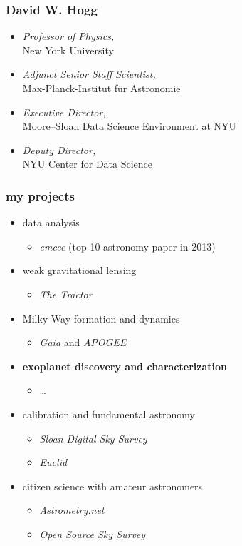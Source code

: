 \documentclass{beamer}
\renewcommand{\emph}[1]{\textbf{#1}}
\newcommand{\project}[1]{\textsl{#1}}
\begin{document}
\begin{frame}
  \frametitle{David W. Hogg}
  \begin{itemize}
  \item \textsl{Professor of Physics,}\\ New York University
  \item \textsl{Adjunct Senior Staff Scientist,}\\ Max-Planck-Institut f\"ur Astronomie
  \item \textsl{Executive Director,}\\ Moore--Sloan Data Science Environment at NYU
  \item \textsl{Deputy Director,}\\ NYU Center for Data Science
  \end{itemize}
\end{frame}

\begin{frame}
  \frametitle{my projects}
  \begin{itemize}
  \item data analysis
    \begin{itemize}
    \item \project{emcee} (top-10 astronomy paper in 2013)
    \end{itemize}
  \item weak gravitational lensing
    \begin{itemize}
    \item \project{The Tractor}
    \end{itemize}
  \item Milky Way formation and dynamics
    \begin{itemize}
    \item \project{Gaia} and \project{APOGEE}
    \end{itemize}
  \item \emph{exoplanet discovery and characterization}
    \begin{itemize}
    \item \ldots
    \end{itemize}
  \item calibration and fundamental astronomy
    \begin{itemize}
    \item \project{Sloan Digital Sky Survey}
    \item \project{Euclid}
    \end{itemize}
  \item citizen science with amateur astronomers
    \begin{itemize}
    \item \project{Astrometry.net}
    \item \project{Open Source Sky Survey}
    \end{itemize}
  \end{itemize}
\end{frame}
\end{document}
